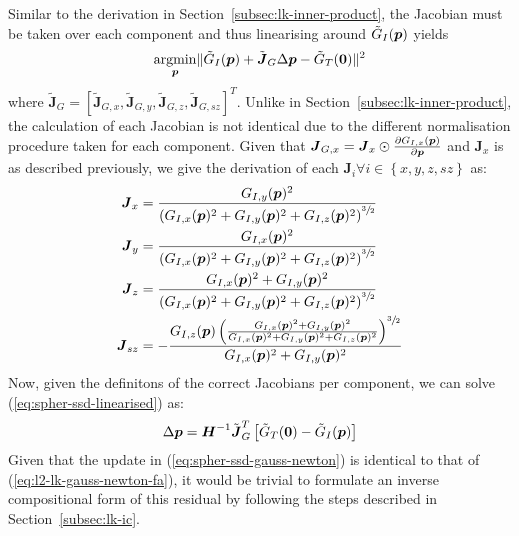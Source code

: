 Similar to the derivation in Section~\ref{subsec:lk-inner-product}, the Jacobian must be taken over each component and thus linearising around $\tilde{G}_I(\boldsymbol{p})$ yields
\begin{equation}\label{eq:spher-ssd-linearised}
    \argmin_{\p} \norm{\tilde{G}_I(\p) + \tilde{\boldsymbol{J}}_G \Delta \p - \tilde{G}_T(\zero)}^2
\end{equation}
where $\tilde{\boldsymbol{J}}_G = \left[ \tilde{\boldsymbol{J}}_{G,x}, \tilde{\boldsymbol{J}}_{G,y}, \tilde{\boldsymbol{J}}_{G,z}, \tilde{\boldsymbol{J}}_{G,sz} \right]^T$. Unlike in Section~\ref{subsec:lk-inner-product}, the calculation of each Jacobian is not identical due to the different normalisation procedure taken for each component. Given that $\boldsymbol{J}_{G,x} = \boldsymbol{J}_x \odot \frac{\partial G_{I,x}(\boldsymbol{p})}{\partial \boldsymbol{p}}$ and $\boldsymbol{J}_x$ is as described previously, we give the derivation of each $\boldsymbol{J}_i \forall i \in \left\{ x,y,z,sz \right\}$ as:
\begin{equation}\label{eq:spher-ssd-chain-rule}
    \begin{aligned}
        \boldsymbol{J}_x    &= \frac{G_{I,y}(\p)^2}{\left(G_{I,x}(\p)^2 + G_{I,y}(\p)^2 + G_{I,z}(\p)^2 \right)^{\sfrac{3}{2}}} \\
        \boldsymbol{J}_y    &= \frac{G_{I,x}(\p)^2}{\left(G_{I,x}(\p)^2 + G_{I,y}(\p)^2 + G_{I,z}(\p)^2 \right)^{\sfrac{3}{2}}} \\
        \boldsymbol{J}_z    &= \frac{G_{I,x}(\p)^2 + G_{I,y}(\p)^2}{\left(G_{I,x}(\p)^2 + G_{I,y}(\p)^2 + G_{I,z}(\p)^2 \right)^{\sfrac{3}{2}}} \\
        \boldsymbol{J}_{sz} &= - \frac{G_{I,z}(\p) \left( \frac{G_{I,x}(\p)^2 + G_{I,y}(\p)^2}{G_{I,x}(\p)^2 + G_{I,y}(\p)^2 + G_{I,z}(\p)^2} \right)^{\sfrac{3}{2}}}{G_{I,x}(\p)^2 + G_{I,y}(\p)^2}
    \end{aligned}
\end{equation}
Now, given the definitons of the correct Jacobians per component, we can solve (\ref{eq:spher-ssd-linearised}) as:
\begin{equation}\label{eq:spher-ssd-gauss-newton}
    \Delta \p = \boldsymbol{H}^{-1} \tilde{\boldsymbol{J}}_G^T \left[ \tilde{G}_T(\zero) - \tilde{G}_I(\p) \right]
\end{equation}
Given that the update in (\ref{eq:spher-ssd-gauss-newton}) is identical to that of (\ref{eq:l2-lk-gauss-newton-fa}), it would be trivial to formulate an inverse compositional form of this residual by following the steps described in Section~\ref{subsec:lk-ic}.